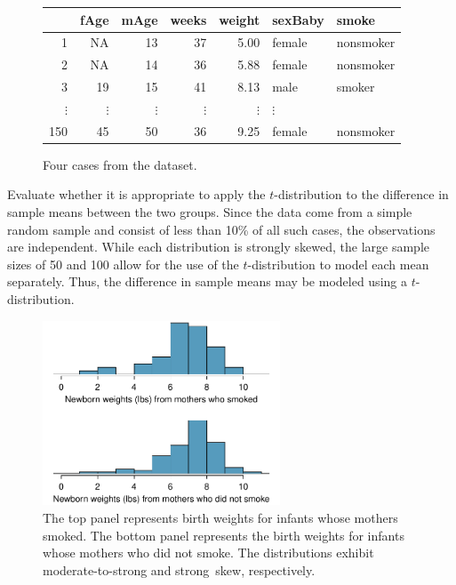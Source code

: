 \begin{figure}[h]
\centering
\begin{tabular}{rrrrrll}
  \hline
 & fAge & mAge & weeks & weight & sexBaby & smoke \\ 
  \hline
1 & NA & 13 &  37 & 5.00 & female & nonsmoker \\ 
  2 & NA & 14 &  36 & 5.88 & female & nonsmoker \\ 
  3 & 19 & 15 &  41 & 8.13 & male & smoker \\ 
  $\vdots$ &   $\vdots$ &   $\vdots$ &   $\vdots$ &   $\vdots$ &   $\vdots$ \\
  150 & 45 & 50 &  36 & 9.25 & female & nonsmoker \\ 
   \hline
\end{tabular}
\caption{Four cases from the  dataset.}
\label{babySmokeDF}
\end{figure}


\begin{examplewrap}
\begin{nexample} {Evaluate whether it is appropriate to apply the $t$-distribution to the difference in sample means between the two groups.}
Since the data come from a simple random sample and consist of less than 10\% of all such cases, the observations are independent. While each distribution is strongly skewed, the large sample sizes of 50 and 100 allow for the use of the $t$-distribution to model each mean separately. Thus, the difference in sample means may be modeled using a $t$-distribution.	
\end{nexample}
\end{examplewrap}

\begin{figure}[hhh]
\centering
\includegraphics[width=0.63\textwidth]{ch_06a_inference_for_means_oi_biostat/figures/babySmokePlotOfTwoGroupsToExamineSkew/babySmokePlotOfTwoGroupsToExamineSkew}
\caption{The top panel represents birth weights for infants whose mothers smoked. The bottom panel represents the birth weights for infants whose mothers who did not smoke. The distributions exhibit moderate-to-strong and strong~skew, respectively.}
\label{babySmokePlotOfTwoGroupsToExamineSkew}
\end{figure}


